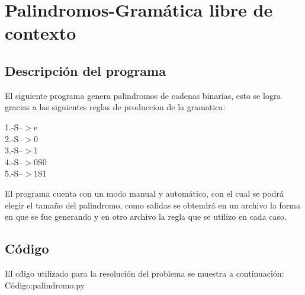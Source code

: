 \section{Palindromos-Gram\'atica libre de contexto}
\subsection{ Descripci\'on del programa}
\justify
El siguiente programa genera palindromos de cadenas binarias, esto se logra gracias a las siguientes reglas de produccion de la gramatica:\\
\begin{center}
1.-S--$>$e\\
2.-S--$>$0\\
3.-S--$>$1\\
4.-S--$>$0S0\\
5.-S--$>$1S1\\
\end{center}
El programa cuenta con un modo manual y autom\'atico, con el cual se podr\'a elegir el tama\~no del palindromo, como salidas se obtendr\'a en un archivo la forma en que se fue generando y en otro archivo la regla que se utilizo en cada caso.
\\
\subsection{C\'odigo}
El c\'digo utilizado para la resoluci\'on del problema se muestra a continuaci\'on:\\

C\'odigo:palindromo.py

